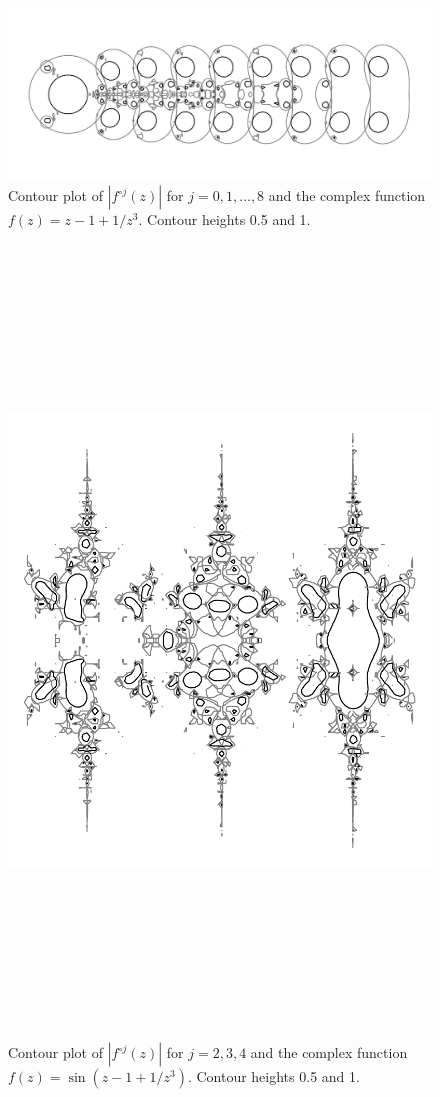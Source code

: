 \documentclass[12pt, a4paper]{amsart}
\begin{document}


\vfill
\pagebreak
\begin{figure}[!ht]
\includegraphics[width=230mm, angle=-90]{caterpillar.pdf}
\caption{
Contour plot of $|f^{\circ j}(z)|$ for $j = 0, 1, \ldots, 8$ and the complex function $f(z) = z - 1 + 1/z^3$.
Contour heights 0.5 and 1.
}
\end{figure}
\pagebreak
\begin{figure}[!ht]
\includegraphics[width=160mm, height=210mm, angle=180]{indian_caterpillar.pdf}
\caption{
Contour plot of $|f^{\circ j}(z)|$ for $j = 2, 3, 4$ and the complex function $f(z) = \sin(z - 1 + 1/z^3)$.
Contour heights 0.5 and 1.
}
\end{figure}
\end{document}
